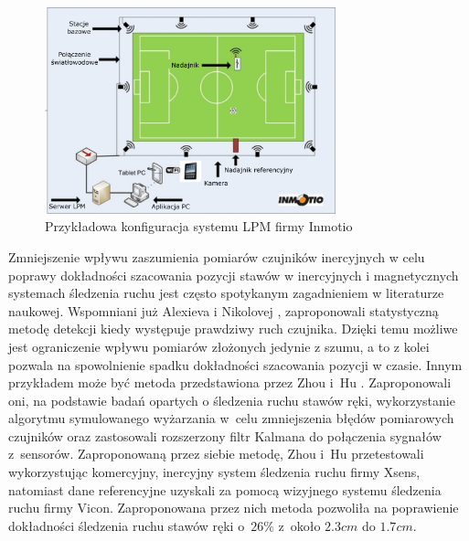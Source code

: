 \begin{savenotes}
	\begin{figure}[!htb]
		\centering	
		\includegraphics[width=0.75\textwidth]{images/lpm.png}
		\caption[Przykładowa konfiguracja systemu LPM firmy Inmotio]{Przykładowa konfiguracja systemu LPM firmy Inmotio}	
		\label{fig:literature:footnote:inmotio:setup}	
	\end{figure}
\end{savenotes}

Zmniejszenie wpływu zaszumienia pomiarów czujników inercyjnych w celu poprawy dokładności szacowania pozycji stawów w inercyjnych i magnetycznych systemach śledzenia ruchu jest często spotykanym zagadnieniem w literaturze naukowej. Wspomniani już Alexieva i Nikolovej \cite{Alexiev2013}, zaproponowali statystyczną metodę detekcji kiedy występuje prawdziwy ruch czujnika. Dzięki temu możliwe jest ograniczenie wpływu pomiarów złożonych jedynie z szumu, a to z kolei pozwala na spowolnienie spadku dokładności szacowania pozycji w czasie. Innym przykładem może być metoda przedstawiona przez Zhou i~Hu \cite{Zhou2005,Zhou2006}. Zaproponowali oni, na podstawie badań opartych o śledzenia ruchu stawów ręki, wykorzystanie algorytmu symulowanego wyżarzania w~celu zmniejszenia błędów pomiarowych czujników oraz zastosowali rozszerzony filtr Kalmana do połączenia sygnałów z~sensorów. Zaproponowaną przez siebie metodę, Zhou i~Hu przetestowali wykorzystując komercyjny, inercyjny system śledzenia ruchu firmy Xsens, natomiast dane referencyjne uzyskali za pomocą wizyjnego systemu śledzenia ruchu firmy Vicon. Zaproponowana przez nich metoda pozwoliła na poprawienie dokładności śledzenia ruchu stawów ręki o~$26\%$ z~około $2.3 cm$ do $1.7 cm$.
							
